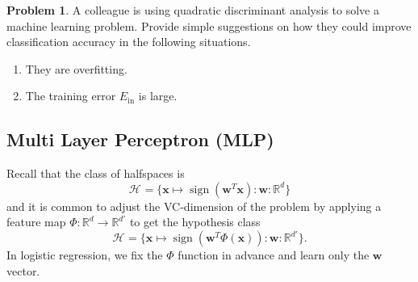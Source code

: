\documentclass[10pt]{exam}
\theoremstyle{definition}
\newtheorem{problem}{Problem}
\newtheorem{note}{Note}
\newcommand{\R}{\mathbb R}
\DeclareMathOperator{\sign}{sign}
\newcommand{\Ein}{E_{\text{in}}}
\newcommand{\trans}[1]{{#1}^{T}}
\newcommand{\w}{\mathbf w}
\newcommand{\x}{\mathbf x}
\newcommand{\HH}[1]{\mathcal H_{\text{#1}}}
\begin{document}



\newpage
\begin{problem}
    A colleague is using quadratic discriminant analysis to solve a machine learning problem.
    Provide simple suggestions on how they could improve classification accuracy in the following situations.
    \begin{enumerate}
        \item
            They are overfitting.
            \vspace{4in}
        \item
            The training error $\Ein$ is large.
    \end{enumerate}
\end{problem}


\newpage
\subsection{Multi Layer Perceptron (MLP)}

Recall that the class of halfspaces is
\begin{equation}
    \HH{} = \bigg\{ \x \mapsto \sign(\trans\w \x) : \w : \R^{d} \bigg\}
\end{equation}
and it is common to adjust the VC-dimension of the problem by applying a feature map
$\Phi : \R^d \to \R^{d'}$ to get the hypothesis class
\begin{equation}
    \HH{} = \bigg\{ \x \mapsto \sign(\trans\w \Phi(\x)) : \w : \R^{d'} \bigg\}
    .
\end{equation}
In logistic regression, we fix the $\Phi$ function in advance and learn only the $\w$ vector.
\end{document}
